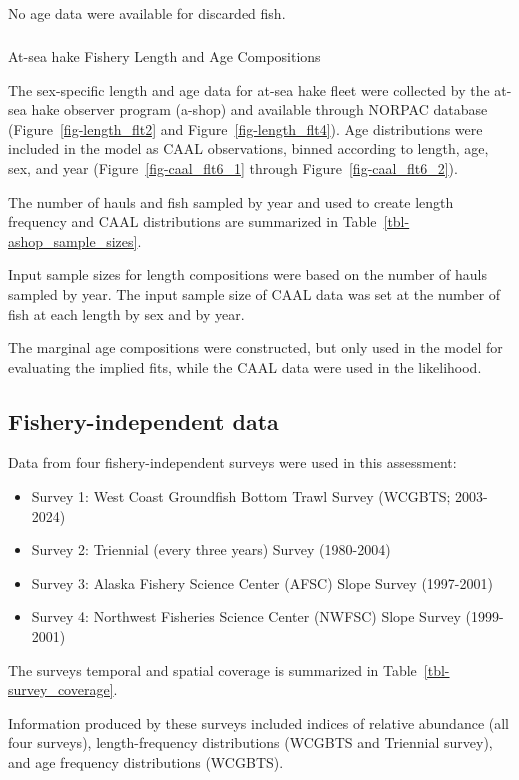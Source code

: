 \documentclass[
]{scrartcl}
\makeatletter
\let\oldsubparagraph\subparagraph
\renewcommand{\subparagraph}{
    \@ifstar
      \xxxSubParagraphStar
      \xxxSubParagraphNoStar
  }
\newcommand{\xxxSubParagraphStar}[1]{\oldsubparagraph*{#1}\mbox{}}
\newcommand{\xxxSubParagraphNoStar}[1]{\oldsubparagraph{#1}\mbox{}}
\providecommand{\tightlist}{%
  \setlength{\itemsep}{0pt}\setlength{\parskip}{0pt}}\usepackage{longtable,booktabs,array}
\makeatother
\begin{document}
No age data were available for discarded fish.

\subparagraph{At-sea hake Fishery Length and Age
Compositions}\label{at-sea-hake-fishery-length-and-age-compositions}

The sex-specific length and age data for at-sea hake fleet were
collected by the at-sea hake observer program (a-shop) and available
through NORPAC database (Figure~\ref{fig-length_flt2} and
Figure~\ref{fig-length_flt4}). Age distributions were included in the
model as CAAL observations, binned according to length, age, sex, and
year (Figure~\ref{fig-caal_flt6_1} through
Figure~\ref{fig-caal_flt6_2}).

The number of hauls and fish sampled by year and used to create length
frequency and CAAL distributions are summarized in
Table~\ref{tbl-ashop_sample_sizes}.

Input sample sizes for length compositions were based on the number of
hauls sampled by year. The input sample size of CAAL data was set at the
number of fish at each length by sex and by year.

The marginal age compositions were constructed, but only used in the
model for evaluating the implied fits, while the CAAL data were used in
the likelihood.

\subsection{Fishery-independent data}\label{sec-surveys}

Data from four fishery-independent surveys were used in this assessment:

\begin{itemize}
\tightlist
\item
  Survey 1: West Coast Groundfish Bottom Trawl Survey (WCGBTS;
  2003-2024)
\item
  Survey 2: Triennial (every three years) Survey (1980-2004)\\
\item
  Survey 3: Alaska Fishery Science Center (AFSC) Slope Survey
  (1997-2001)
\item
  Survey 4: Northwest Fisheries Science Center (NWFSC) Slope Survey
  (1999-2001)
\end{itemize}

The surveys temporal and spatial coverage is summarized in
Table~\ref{tbl-survey_coverage}.

Information produced by these surveys included indices of relative
abundance (all four surveys), length-frequency distributions (WCGBTS and
Triennial survey), and age frequency distributions (WCGBTS).
\end{document}
